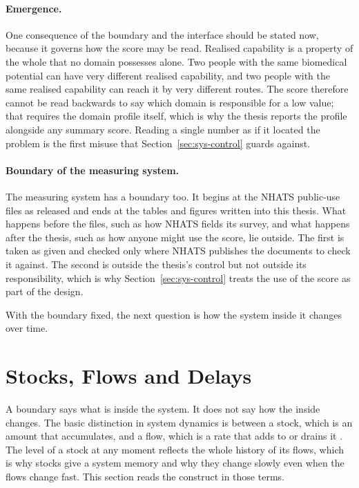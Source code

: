 \paragraph{Emergence.} One consequence of the boundary and the interface
should be stated now, because it governs how the score may be read. Realised
capability is a property of the whole that no domain possesses alone. Two
people with the same biomedical potential can have very different realised
capability, and two people with the same realised capability can reach it by
very different routes. The score therefore cannot be read backwards to say
which domain is responsible for a low value; that requires the domain profile
itself, which is why the thesis reports the profile alongside any summary
score. Reading a single number as if it located the problem is the first
misuse that Section~\ref{sec:sys-control} guards against.

\paragraph{Boundary of the measuring system.} The measuring system has a
boundary too. It begins at the NHATS public-use files as released and ends at
the tables and figures written into this thesis. What happens before the
files, such as how NHATS fields its survey, and what happens after the
thesis, such as how anyone might use the score, lie outside. The first is
taken as given and checked only where NHATS publishes the documents to check
it against. The second is outside the thesis's control but not outside its
responsibility, which is why Section~\ref{sec:sys-control} treats the use of
the score as part of the design.

With the boundary fixed, the next question is how the system inside it
changes over time.

\section{Stocks, Flows and Delays}
\label{sec:sys-stocks}

A boundary says what is inside the system. It does not say how the inside
changes. The basic distinction in system dynamics is between a stock, which is
an amount that accumulates, and a flow, which is a rate that adds to or drains
it \citep{forrester_1961,sterman_2000}. The level of a stock at any moment
reflects the whole history of its flows, which is why stocks give a system memory and
why they change slowly even when the flows change fast. This section reads
the construct in those terms.


